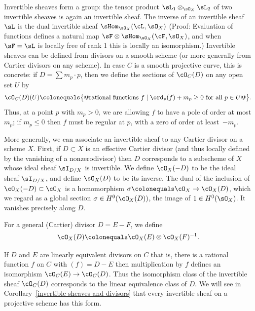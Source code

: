 Invertible sheaves form a group: the tensor product
$\sL_1\otimes_{\sO_X}\sL_2$ of two invertible sheaves is  again an invertible sheaf.
The
inverse of an invertible sheaf $\sL$ is  the dual invertible sheaf $\sHom_{\sO_X}(\cL,\sO_X)$
(Proof: Evaluation of functions defines a natural map $\sF \otimes  \sHom_{\sO_X}(\cF,\sO_X)$,
and when $\sF = \sL$ is locally free of rank 1 this is locally an isomorphism.)
Invertible sheaves can be defined from divisors on a smooth scheme (or more generally from Cartier divisors on any scheme). In case $C$ is a smooth projective curve, this is concrete: if $D = \sum m_p \cdot p$, then we define the sections of $\cO_C(D)$ on any open set $U$ by
$$
\cO_C(D)(U) \colonequals \bigl\{@
\text{rational functions } f \mid \ord_p(f) + m_p \geq 0 
\text{ for all } p \in U @\bigr\}.
$$
Thus, at a point $p$ with $m_p > 0$, we are allowing $f$ to have a pole of order at most $m_p$; if $m_p \leq 0$ then $f$ must be regular at $p$, with a zero of order at least~$-m_p$.

More generally, we can associate an invertible sheaf to any
Cartier divisor
%
on a scheme $X$.
First, if
 $D\subset X$ is an effective Cartier divisor (and thus locally defined by the vanishing of a nonzerodivisor) then
$D$ corresponds to a subscheme of $X$ whose ideal sheaf $\sI_{D/X}$
is invertible. We define $\cO_X(-D)$ to be the ideal sheaf $\sI_{D/X}$, and define $\sO_{X}(D)$ to be
its inverse. The dual of the inclusion of
$\cO_X(-D) \subset \cO_X$ is a homomorphism $\sigma \colonequals \cO_X \to
\cO_X(D)$,
which
we regard as a global section $\sigma \in H^0(\cO_X(D))$, the image of $1\in H^0(\sO_X)$. It
vanishes precisely along $D$.

For a general (Cartier) divisor $D = E - F$, we define
$$
\cO_X(D) \colonequals \cO_X(E) \otimes \cO_X(F)^{-1}.
$$

If $D$ and $E$ are linearly equivalent divisors on $C$ \emdash that is,
there is a rational function $f$ on $C$ with $(f) = D - E$ \emdash
then multiplication by $f$ defines an isomorphism
$\cO_C(E) \to \cO_C(D)$.
Thus the isomorphism class of the invertible sheaf $\cO_C(D)$
corresponds to the linear equivalence class of $D$. We will see
in Corollary~\ref{invertible sheaves and divisors}
that every invertible sheaf on a projective scheme has this form.

